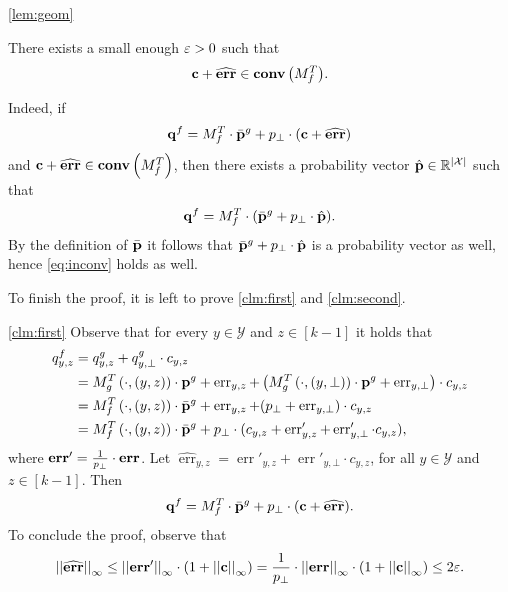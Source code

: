 \documentclass{llncs}
\newcommand{\X}{\mathcal{X}}
\newcommand{\Y}{\mathcal{Y}}
\newcommand{\CH}[1]{\normalfont{\mathbf{conv}\of{#1}}}
\newcommand{\p}{\myvec{p}}
\renewcommand{\q}{\myvec{q}}
\renewcommand{\c}{\myvec{c}}
\newcommand{\errvec}{\myvec{err}}
\newcommand{\errval}{\operatorname{err}}
\newcommand{\norm}[2]{\left|\left|#1\right|\right|_{#2}}
\begin{document}
\begin{proofof}{\cref{lem:geom}}
\begin{claim}\label{clm:second}
There exists a small enough $\varepsilon>0$ such that $$\c+\widehat{\errvec}\in\CH{M^T_f}.$$
\end{claim}
Indeed, if 
$$\q^f=M_f^T\cdot\bar{\p}^g+p_\bot\cdot(\c+\widehat{\errvec})$$
and $\c+\widehat{\errvec}\in\CH{M^T_f}$, then there exists a probability vector $\hat{\p}\in\R^{|\X|}$ such that
$$\q^f=M_f^T\cdot(\bar{\p}^g+p_\bot\cdot\hat{\p}).$$
By the definition of $\bar{\p}$ it follows that $\bar{\p}^g+p_\bot\cdot\hat{\p}$ is a probability vector as well, hence \cref{eq:inconv} holds as well.
\end{proofof}

To finish the proof, it is left to prove \cref{clm:first} and \cref{clm:second}.

\begin{proofof}{\cref{clm:first}}
Observe that for every $y\in\Y$ and $z\in[k-1]$ it holds that
\begin{align*}
q^{f}_{y,z}
&=q^{g}_{y,z}+q^{g}_{y,\bot}\cdot c_{y,z}\\
&=M_g^T\of{\cdot,(y,z)}\cdot\p^g+\errval_{y,z}+\left(M_g^T\of{\cdot,(y,\bot)}\cdot\p^g+\errval_{y,\bot}\right)\cdot c_{y,z}\\
&=M_f^T\of{\cdot,(y,z)}\cdot\bar{\p}^g+\errval_{y,z}+(p_\bot+\errval_{y,\bot})\cdot c_{y,z}\\
&=M_f^T\of{\cdot,(y,z)}\cdot\bar{\p}^g+p_\bot\cdot(c_{y,z}+\errval'_{y,z}+\errval'_{y,\bot}\cdot c_{y,z}),
\end{align*}
where $\errvec'=\frac{1}{p_\bot}\cdot\errvec$.
Let $\widehat{\errval}_{y,z}=\errval'_{y,z}+\errval'_{y,\bot}\cdot c_{y,z}$, for all $y\in\Y$ and $z\in[k-1]$.
Then 
$$\q^f=M_f^T\cdot\bar{\p}^g+p_\bot\cdot(\c+\widehat{\errvec}).$$
To conclude the proof, observe that
$$\norm{\widehat{\errvec}}{\infty}\leq\norm{\errvec'}{\infty}\cdot(1+\norm{\c}{\infty})=\frac{1}{p_\bot}\cdot\norm{\errvec}{\infty}\cdot(1+\norm{\c}{\infty})\leq2\eps.$$
\end{proofof}
\end{document}
